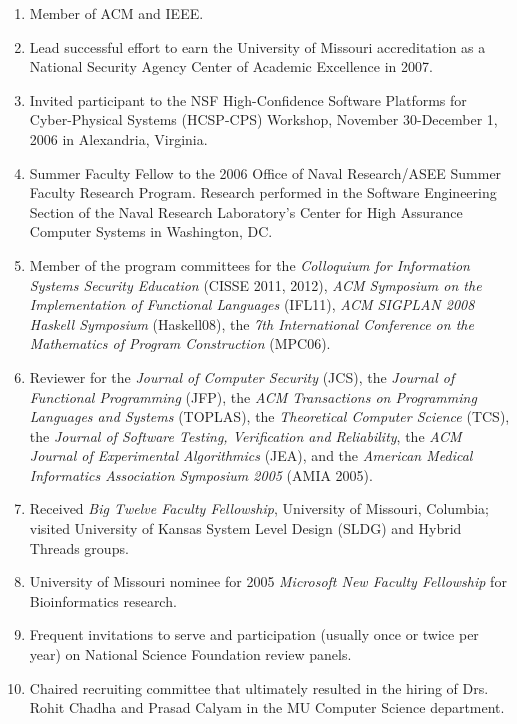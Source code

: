 \documentclass[12pt]{article} %
\begin{document}
\begin{enumerate}[leftmargin=0mm]
\item Member of ACM and IEEE.

\item Lead successful effort to earn the University of Missouri accreditation as a National Security Agency Center of Academic Excellence in 2007. 

\item Invited participant to the NSF High-Confidence Software
  Platforms for Cyber-Physical Systems (HCSP-CPS) Workshop, November
  30-December 1, 2006 in Alexandria, Virginia.


\item Summer Faculty Fellow to the 2006 Office of Naval Research/ASEE
  Summer Faculty Research Program. Research performed in the Software
  Engineering Section of the Naval Research Laboratory's Center for
  High Assurance Computer Systems in Washington, DC. 

\item  Member of the program committees for the {\em Colloquium for Information Systems Security Education} (CISSE 2011, 2012), {\em ACM Symposium on the Implementation of Functional Languages} (IFL11), {\em ACM SIGPLAN 2008
    Haskell Symposium} (Haskell08), the {\em 7th International
Conference on the Mathematics of Program Construction} (MPC06).

\item Reviewer for the {\em Journal of Computer Security} (JCS), the {\em Journal of Functional Programming} (JFP),
the {\em ACM Transactions on Programming Languages and Systems} (TOPLAS),
the {\em Theoretical Computer Science} (TCS),
the {\em Journal of Software Testing, Verification and Reliability},
the {\em ACM Journal of Experimental Algorithmics} (JEA), and the {\em American
Medical Informatics Association Symposium 2005} (AMIA 2005). 


\item Received \emph{Big Twelve Faculty Fellowship}, University of
  Missouri, Columbia; visited University of Kansas System Level Design (SLDG)
  and Hybrid Threads groups.




\item University of Missouri nominee for 2005 {\em Microsoft New Faculty Fellowship} for Bioinformatics research.

\item Frequent invitations to serve and participation (usually once or twice per year)  on National Science Foundation review panels.


\item Chaired recruiting committee that ultimately resulted in the hiring of Drs. Rohit Chadha and Prasad Calyam in the MU Computer Science department. 


\end{enumerate}
\end{document}
